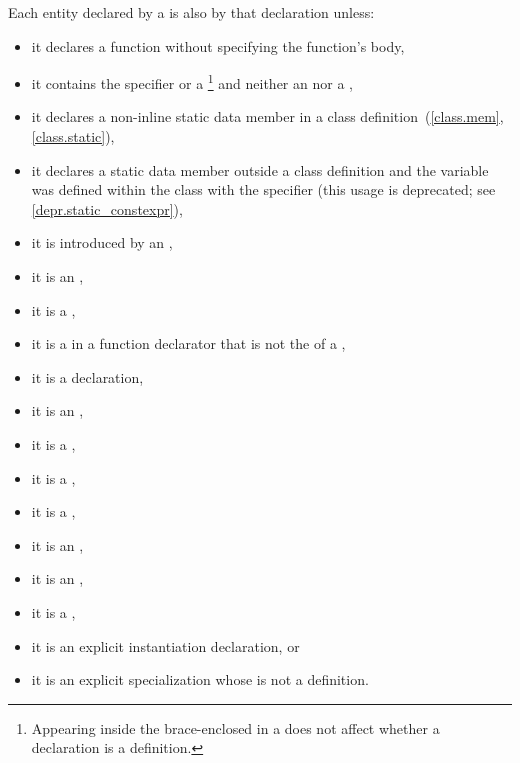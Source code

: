 \pnum
{}%
%
Each entity declared by a  is
also  by that declaration unless:
\begin{itemize}
\item
it declares a function
without specifying the function's body,
\item
it contains
the
%
 specifier or a
\footnote{Appearing inside the brace-enclosed
 in a  does
not affect whether a declaration is a definition.}
and neither an  nor a
,
\item
{}%
it declares a non-inline static data member in a class
definition~(\ref{class.mem}, \ref{class.static}),
\item
it declares a static data member outside a class definition
and the variable was defined within the class with the 
specifier (this usage is deprecated; see \ref{depr.static_constexpr}),
\item
{}%
it is introduced by an ,
\item
it is an
%
,
\item
it is a
%
,
\item
it is a
%
 in a function
%
declarator that is not the  of a
,
\item
it is a
%
 declaration,
\item it is
an ,
\item it is
a
,
\item it is
a ,
\item it is
a ,
\item
it is an
,
\item
it is an
,
\item it is
a ,
\item it is
an explicit instantiation declaration, or
\item it is
an explicit specialization whose
 is not a definition.
\end{itemize}
